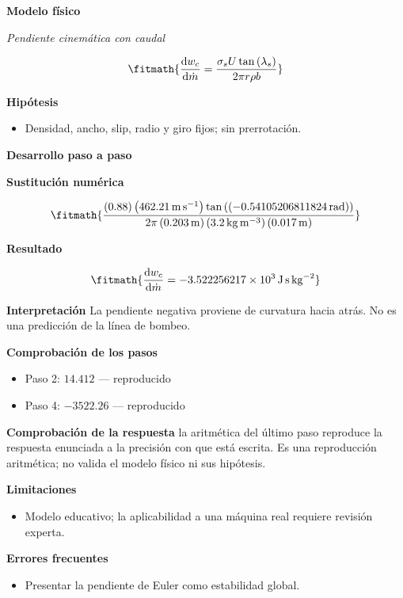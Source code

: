 \documentclass[10pt,openany]{book}
\begin{document}
\noindent\textbf{Modelo físico}

\noindent\textit{Pendiente cinemática con caudal}

\[
\fitmath{\frac{\mathrm{d}w_c}{\mathrm{d}\dot{m}}=\frac{\sigma_s U \tan{\left(\lambda_s \right)}}{2 \pi r \rho b}}
\]

\noindent\textbf{Hipótesis}
\begin{itemize}
\item Densidad, ancho, slip, radio y giro fijos; sin prerrotación.
\end{itemize}

\noindent\textbf{Desarrollo paso a paso}



\noindent\textbf{Sustitución numérica}

\[
\fitmath{\frac{\left(0.88\right) \left(462.21\,\mathrm{m}\,\mathrm{s}^{-1}\right) \tan{\left(\left(-0.54105206811824\,\mathrm{rad}\right) \right)}}{2 \pi \left(0.203\,\mathrm{m}\right) \left(3.2\,\mathrm{kg}\,\mathrm{m}^{-3}\right) \left(0.017\,\mathrm{m}\right)}}
\]

\noindent\textbf{Resultado}

\[
\fitmath{\frac{\mathrm{d}w_c}{\mathrm{d}\dot{m}}=-3.522256217\times10^{3}\,\mathrm{J}\,\mathrm{s}\,\mathrm{kg}^{-2}}
\]

\noindent\textbf{Interpretación}
La pendiente negativa proviene de curvatura hacia atrás. No es una predicción de la línea de bombeo.

\noindent\textbf{Comprobación de los pasos}
\begin{itemize}
\item Paso 2: $14.412$ — reproducido
\item Paso 4: $-3522.26$ — reproducido
\end{itemize}

\noindent\textbf{Comprobación de la respuesta} la aritmética del último paso reproduce la respuesta enunciada a la precisión con que está escrita. Es una reproducción aritmética; no valida el modelo físico ni sus hipótesis.

\noindent\textbf{Limitaciones}
\begin{itemize}
\item Modelo educativo; la aplicabilidad a una máquina real requiere revisión experta.
\end{itemize}

\noindent\textbf{Errores frecuentes}
\begin{itemize}
\item Presentar la pendiente de Euler como estabilidad global.
\end{itemize}
\end{document}
